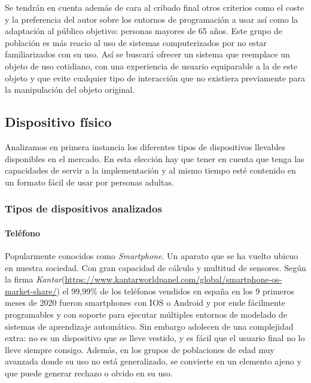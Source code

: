 Se tendrán en cuenta además de cara al cribado final otros criterios como el coste y la preferencia del autor sobre los entornos de programación a usar así como la adaptación al público objetivo: personas mayores de 65 años. Este grupo de población es más reacio al uso de sistemas computerizados por no estar familiarizados con su uso. Así se buscará ofrecer un sistema que reemplace un objeto de uso cotidiano, con una experiencia de usuario equiparable a la de este objeto y que evite cualquier tipo de interacción que no existiera previamente para la manipulación del objeto original.

\subsection{Dispositivo físico}\label{sub:req:hardware}

Analizamos en primera instancia los diferentes tipos de dispositivos llevables disponibles en el mercado. En esta elección hay que tener en cuenta que tenga las capacidades de servir a la implementación y al mismo tiempo esté contenido en un formato fácil de usar por personas adultas.

\subsubsection{Tipos de dispositivos analizados}

\paragraph{Teléfono} Popularmente conocidos como \textit{Smartphone}. Un aparato que se ha vuelto ubicuo en nuestra sociedad. Con gran capacidad de cálculo y multitud de sensores. Según la firma \textit{Kantar}(\url{https://www.kantarworldpanel.com/global/smartphone-os-market-share/}) el 99,99\% de los teléfonos vendidos en españa en los 9 primeros meses de 2020 fueron smartphones con IOS o Android y por ende fácilmente programables y con soporte para ejecutar múltiples entornos de modelado de sistemas de aprendizaje automático. Sin embargo adolecen de una complejidad extra: no es un dispositivo que se lleve vestido, y es fácil que el usuario final no lo lleve siempre consigo. Además, en los grupos de poblaciones de edad muy avanzada donde su uso no está generalizado, se convierte en un elemento ajeno y que puede generar rechazo o olvido en su uso.


